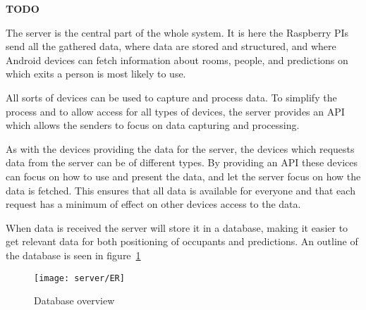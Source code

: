 {\color[rgb]{1,0,0} \textbf{\large TODO}}

The server is the central part of the whole system. It is here the Raspberry PIs send all the gathered data, where data are stored and structured, and where Android devices can fetch information about rooms, people, and predictions on which exits a person is most likely to use.

All sorts of devices can be used to capture and process data. To simplify the process and to allow access for all types of devices, the server provides an API which allows the senders to focus on data capturing and processing.

As with the devices providing the data for the server, the devices which requests data from the server can be of different types. By providing an API these devices can focus on how to use and present the data, and let the server focus on how the data is fetched. This ensures that all data is available for everyone and that each request has a minimum of effect on other devices access to the data.

When data is received the server will store it in a database, making it easier to get relevant data for both positioning of occupants and predictions. An outline of the database is seen in figure~\ref{fig:database_er_diagram} 

\begin{figure}[htb]
	\centering
	\texttt{[image: server/ER]}
	\caption{Database overview}
	\label{fig:database_er_diagram}
\end{figure}